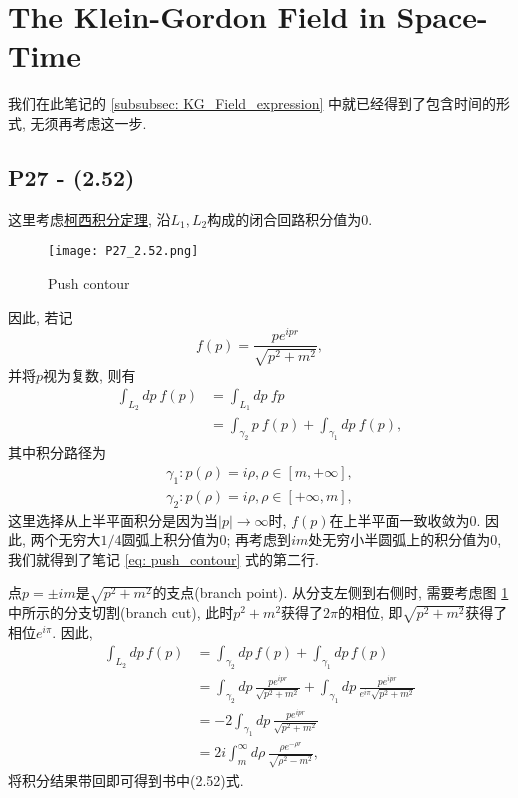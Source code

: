 \section{The Klein-Gordon Field in Space-Time}

我们在此笔记的 \ref{subsubsec: KG_Field_expression} 中就已经得到了包含时间的形式, 无须再考虑这一步.

\subsection{P27 - (2.52)}
这里考虑\href{https://zh.wikipedia.org/wiki/柯西积分定理}{柯西积分定理},
沿$L_1, L_2$构成的闭合回路积分值为0.

\begin{figure}[htbp]
  \centering
  \texttt{[image: P27\_2.52.png]}
  \caption{Push contour}
  \label{fig: pushcon}
\end{figure}

因此, 若记
\begin{equation}
  f(p) = \frac{pe^{ipr}}{\sqrt{p^2+m^2}},
\end{equation}
并将$p$视为复数, 则有
\begin{equation}\label{eq: push_contour}
  \begin{aligned}
    \int_{L_2}dp\ f(p) & = \int_{L_1}dp\ fp                                  \\
                       & = \int_{\gamma_2}p\ f(p) + \int_{\gamma_1}dp\ f(p),
  \end{aligned}
\end{equation}
其中积分路径为
\begin{equation*}
  \begin{aligned}
    \gamma_1: p(\rho) = i\rho, \rho\in[m,+\infty], \\
    \gamma_2: p(\rho) = i\rho, \rho\in[+\infty,m],
  \end{aligned}
\end{equation*}
这里选择从上半平面积分是因为当$|p|\to\infty$时, $f(p)$在上半平面一致收敛为0.
因此, 两个无穷大$1/4$圆弧上积分值为0; 再考虑到$im$处无穷小半圆弧上的积分值为0, 我们就得到了笔记 \eqref{eq: push_contour} 式的第二行.

点$p = \pm im$是$\sqrt{p^2+m^2}$的支点(branch point).
从分支左侧到右侧时, 需要考虑图 \ref{fig: pushcon} 中所示的分支切割(branch cut), 此时$p^2+m^2$获得了$2\pi$的相位, 即$\sqrt{p^2+m^2}$获得了相位$e^{i\pi}$.
因此,
\begin{equation}
  \begin{aligned}
    \int_{L_2}dp\,f(p) & = \int_{\gamma_2}dp\,f(p) + \int_{\gamma_1}dp\,f(p)                     \\
                       & = \int_{\gamma_2}dp\,\frac{pe^{ipr}}{\sqrt{p^2+m^2}}
    + \int_{\gamma_1}dp\,\frac{pe^{ipr}}{e^{i\pi}\sqrt{p^2+m^2}}                                 \\
                       & = -2\int_{\gamma_1}dp\,\frac{pe^{ipr}}{\sqrt{p^2+m^2}}                  \\
                       & = 2i\int_{m}^{\infty}d\rho\,\frac{\rho e^{-\rho r}}{\sqrt{\rho^2-m^2}},
  \end{aligned}
\end{equation}
将积分结果带回即可得到书中(2.52)式.

